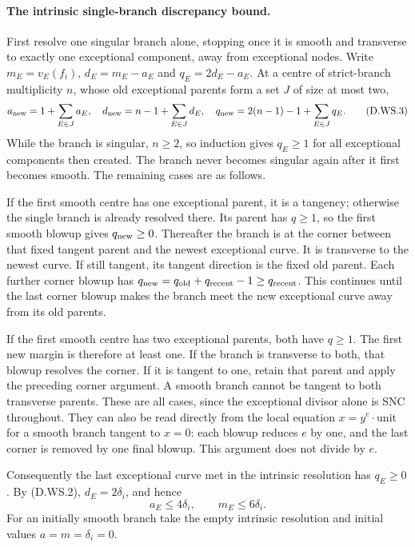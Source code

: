 \paragraph{The intrinsic single-branch discrepancy bound.}
First resolve one singular branch alone, stopping once it is smooth and
transverse to exactly one exceptional component, away from exceptional
nodes.  Write $m_E=v_E(f_i)$, $d_E=m_E-a_E$ and
$q_E=2d_E-a_E$.  At a centre of strict-branch multiplicity $n$, whose
old exceptional parents form a set $J$ of size at most two,
\[
 a_{\rm new}=1+\sum_{E\in J}a_E,\quad
 d_{\rm new}=n-1+\sum_{E\in J}d_E,\quad
 q_{\rm new}=2(n-1)-1+\sum_{E\in J}q_E.              \tag{D.WS.3}
\]
While the branch is singular, $n\ge2$, so induction gives $q_E\ge1$
for all exceptional components then created.  The branch never becomes
singular again after it first becomes smooth.  The remaining cases are
as follows.

If the first smooth centre has one exceptional parent, it is a tangency;
otherwise the single branch is already resolved there.  Its parent has
$q\ge1$, so the first smooth blowup gives $q_{\rm new}\ge0$.
Thereafter the branch is at the corner between that fixed tangent
parent and the newest exceptional curve.  It is transverse to the
newest curve.  If still tangent, its tangent direction is the fixed
old parent.  Each further corner blowup has
$q_{\rm new}=q_{\rm old}+q_{\rm recent}-1\ge q_{\rm recent}$.
This continues until the last corner blowup makes the branch meet the
new exceptional curve away from its old parents.

If the first smooth centre has two exceptional parents, both have
$q\ge1$.  The first new margin is therefore at least one.  If the
branch is transverse to both, that blowup resolves the corner.  If
it is tangent to one, retain that parent and apply the preceding
corner argument.  A smooth branch cannot be tangent to both transverse
parents.  These are all cases, since the exceptional divisor alone is
SNC throughout.  They can also be read directly from the local
equation $x=y^e\cdot\text{unit}$ for a smooth branch tangent to
$x=0$: each blowup reduces $e$ by one, and the last corner is removed
by one final blowup.  This argument does not divide by $e$.

Consequently the last exceptional curve met in the intrinsic resolution
has $q_E\ge0$.  By (D.WS.2), $d_E=2\delta_i$, and hence
\[
             a_E\le4\delta_i,\qquad m_E\le6\delta_i.
                                                               \tag{D.WS.4}
\]
For an initially smooth branch take the empty intrinsic resolution and
initial values $a=m=\delta_i=0$.

